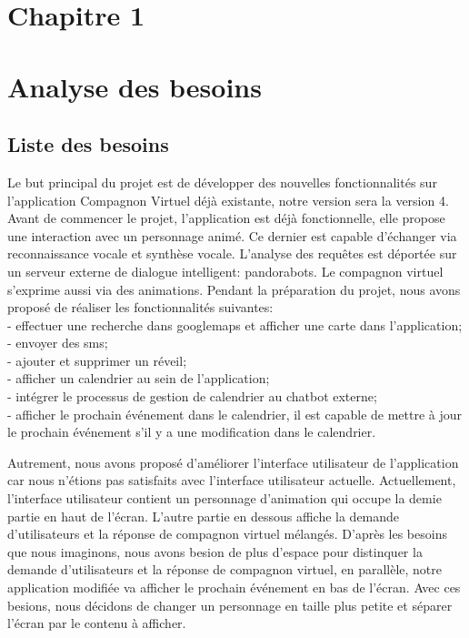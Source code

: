 \section*{Chapitre 1}
\section{Analyse des besoins}
\subsection{Liste des besoins}
Le but principal du projet est de développer des nouvelles fonctionnalités sur l'application Compagnon Virtuel déjà existante, notre version sera la version 4.
Avant de commencer le projet, l'application est déjà fonctionnelle, elle propose une interaction avec un personnage animé. Ce dernier est capable d'échanger via reconnaissance vocale et synthèse vocale. L'analyse des requêtes est déportée sur un serveur externe de dialogue intelligent: pandorabots. Le compagnon virtuel s'exprime aussi via des animations. Pendant la préparation du projet, nous avons proposé de réaliser les fonctionnalités suivantes:\\
	\indent- effectuer une recherche dans googlemaps et afficher une carte dans l'application;\\
	\indent- envoyer des sms;\\
	\indent- ajouter et supprimer un réveil;\\
	\indent- afficher un calendrier au sein de l'application;\\
	\indent- intégrer le processus de gestion de calendrier au chatbot externe;\\
	\indent- afficher le prochain événement dans le calendrier, il est capable de mettre à jour le prochain événement s'il y a une modification dans le calendrier.
	
Autrement, nous avons proposé d'améliorer l'interface utilisateur de l'application car nous n'étions pas satisfaits avec l'interface utilisateur actuelle. Actuellement, l'interface utilisateur contient un personnage d'animation qui occupe la demie partie en haut de l'écran. L'autre partie en dessous affiche la demande d'utilisateurs et la réponse de compagnon virtuel mélangés. D'après les besoins  que nous imaginons, nous avons besion de plus d'espace pour distinquer la demande d'utilisateurs et la réponse de compagnon virtuel, en parallèle, notre application modifiée va afficher le prochain événement en bas de l'écran. Avec ces besions, nous décidons de changer un personnage en taille plus petite et séparer l'écran par le contenu à afficher. 

